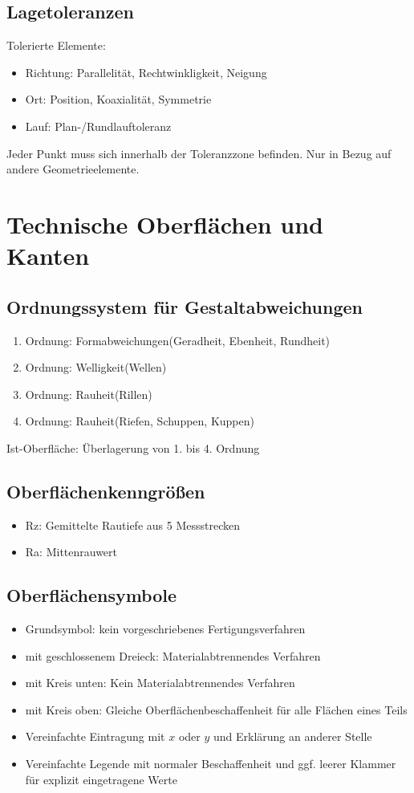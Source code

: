 \documentclass[a4paper,parskip=half*,DIV=7,fontsize=11pt]{scrartcl}
\begin{document}
\subsection{Lagetoleranzen}
Tolerierte Elemente:
\begin{itemize}
	\item Richtung: Parallelität, Rechtwinkligkeit, Neigung
	\item Ort: Position, Koaxialität, Symmetrie
	\item Lauf: Plan-/Rundlauftoleranz
\end{itemize}
Jeder Punkt muss sich innerhalb der Toleranzzone befinden. Nur in Bezug auf andere Geometrieelemente.
	
\section{Technische Oberflächen und Kanten}
\subsection{Ordnungssystem für Gestaltabweichungen}
\begin{enumerate}
	\item Ordnung: Formabweichungen(Geradheit, Ebenheit, Rundheit)
	\item Ordnung: Welligkeit(Wellen)
	\item Ordnung: Rauheit(Rillen)
	\item Ordnung: Rauheit(Riefen, Schuppen, Kuppen)
\end{enumerate}

Ist-Oberfläche: Überlagerung von 1. bis 4. Ordnung

\subsection{Oberflächenkenngrößen}
\begin{itemize}
	\item Rz: Gemittelte Rautiefe aus 5 Messstrecken 
	\item Ra: Mittenrauwert
\end{itemize}
	
\subsection{Oberflächensymbole}
\begin{itemize}
	\item Grundsymbol: kein vorgeschriebenes Fertigungsverfahren
	\item mit geschlossenem Dreieck: Materialabtrennendes Verfahren
	\item mit Kreis unten: Kein Materialabtrennendes Verfahren
	\item mit Kreis oben: Gleiche Oberflächenbeschaffenheit für alle Flächen eines Teils
	\item Vereinfachte Eintragung mit $x$ oder $y$ und Erklärung an anderer Stelle
	\item Vereinfachte Legende mit normaler Beschaffenheit und ggf. leerer Klammer für explizit eingetragene Werte
\end{itemize}
	
\end{document}
